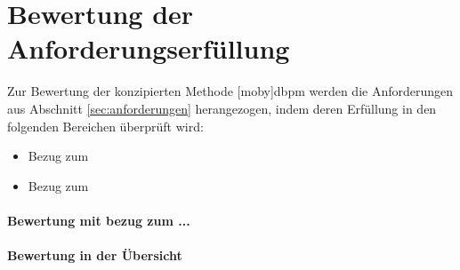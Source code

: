\section{Bewertung der Anforderungserfüllung}\label{sec:Evaluierung}
Zur Bewertung der konzipierten Methode [moby]dbpm werden die Anforderungen aus Abschnitt \ref{sec:anforderungen} herangezogen, indem deren Erfüllung in den folgenden Bereichen überprüft wird:

\begin{itemize}
	\item Bezug zum
    \item Bezug zum
\end{itemize}

\paragraph{Bewertung mit bezug zum ...}


\paragraph{Bewertung in der Übersicht}

